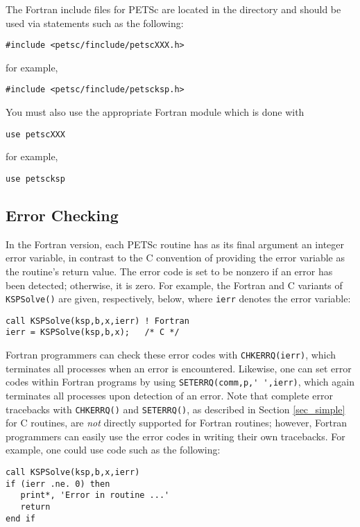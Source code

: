 {The Fortran include files for PETSc are located in the directory
 and should be used via statements
such as the following:
\begin{lstlisting}
#include <petsc/finclude/petscXXX.h>
\end{lstlisting}
for example,
\begin{lstlisting}
#include <petsc/finclude/petscksp.h>
\end{lstlisting}
You must also use the appropriate Fortran module which is done with
\begin{lstlisting}
use petscXXX
\end{lstlisting}
for example,
\begin{lstlisting}
use petscksp
\end{lstlisting}

\subsection{Error Checking}
\label{sec_fortran_errors}

In the Fortran version, each PETSc routine has as its final argument
an integer error variable, in contrast to the C convention of
providing the error variable as the routine's return value.  The error
code is set to be nonzero if an error has been detected; otherwise, it
is zero.  For example, the Fortran and C variants of \lstinline{KSPSolve()} are
given, respectively, below, where \lstinline{ierr} denotes the error variable:
\begin{lstlisting}
call KSPSolve(ksp,b,x,ierr) ! Fortran
ierr = KSPSolve(ksp,b,x);   /* C */
\end{lstlisting}

Fortran programmers
can check these error codes with
\lstinline{CHKERRQ(ierr)}, which terminates all processes when an error is
encountered.  Likewise, one can set error codes within Fortran programs by
using \lstinline{SETERRQ(comm,p,' ',ierr)}, which again terminates all processes
upon detection of an error.
Note that complete error tracebacks with
\lstinline{CHKERRQ()} and \lstinline{SETERRQ()}, as described in Section
\ref{sec_simple} for C routines, are {\em not} directly supported for
Fortran routines; however, Fortran programmers can easily use the
error codes in writing their own tracebacks.  For example, one could
use code such as the following:
\begin{lstlisting}
call KSPSolve(ksp,b,x,ierr)
if (ierr .ne. 0) then
   print*, 'Error in routine ...'
   return
end if
\end{lstlisting}

}
